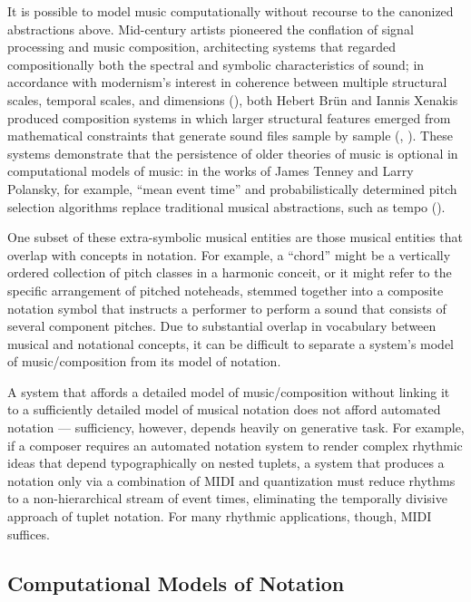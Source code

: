 It is possible to model music computationally without recourse to the canonized abstractions above. Mid-century artists pioneered the conflation of signal processing and music composition, architecting systems that regarded compositionally both the spectral and symbolic characteristics of sound; in accordance with modernism's interest in coherence between multiple structural scales, temporal scales, and dimensions (\cite{Stockhausen:1962fu}), both Hebert Br\"{u}n and Iannis Xenakis produced composition systems in which larger structural features emerged from mathematical constraints that generate sound files sample by sample (\cite{Luque2009}, \cite{Brun:1969il}). These systems demonstrate that the persistence of older theories of music is optional in computational models of music: in the works of James Tenney and Larry Polansky, for example, ``mean event time'' and probabilistically determined pitch selection algorithms replace traditional musical abstractions, such as tempo (\cite{Polansky:2010fc}).

One subset of these extra-symbolic musical entities are those musical entities that overlap with concepts in notation. For example, a ``chord'' might be a vertically ordered collection of pitch classes in a harmonic conceit, or it might refer to the specific arrangement of pitched noteheads, stemmed together into a composite notation symbol that instructs a performer to perform a sound that consists of several component pitches. Due to substantial overlap in vocabulary between musical and notational concepts, it can be difficult to separate a system's model of music/composition from its model of notation.

A system that affords a detailed model of music/composition without linking it to a sufficiently detailed model of musical notation does not afford automated notation --- sufficiency, however, depends heavily on generative task. For example, if a composer requires an automated notation system to render complex rhythmic ideas that depend typographically on nested tuplets, a system that produces a notation only via a combination of MIDI and quantization must reduce rhythms to a non-hierarchical stream of event times, eliminating the temporally divisive approach of tuplet notation. For many rhythmic applications, though, MIDI suffices. 

\subsection{Computational Models of Notation}

